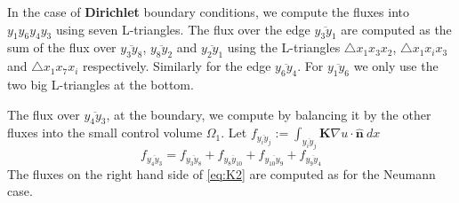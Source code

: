 \documentclass[../Main/main.tex]{subfiles}
\begin{document}
	\par
	In the case of \textbf{Dirichlet} boundary conditions, we compute the fluxes into $y_1 y_6 y_4 y_3$ using seven L-triangles. The flux over the edge $\overline{y_3 y_1}$ are computed as the sum of the flux over $\overline{y_3 y_8}$, $\overline{y_8 y_2}$ and $\overline{y_2 y_1}$ using the L-triangles $\triangle x_1 x_3 x_2$, $\triangle x_1 x_i x_3$ and $\triangle x_1 x_7 x_i$ respectively. Similarly for the edge $\overline{y_6 y_4}$. For $\overline{y_1 y_6}$ we only use the two big L-triangles at the bottom. 
	\par 
	The flux over $\overline{y_4 y_3}$, at the boundary, we compute by balancing it by the other fluxes into the small control volume $\Omega_1$. Let $	f_{\overline{y_i y_j}}:= \int_{\overline{y_i y_j}}  \pmb{K}\nabla u \cdot \pmb{\hat{n}}\ dx $
	\begin{equation}\label{eq:K2}
		f_{\overline{y_4 y_3}} = f_{\overline{y_3 y_8}} + f_{\overline{y_8 y_{10}}}+f_{\overline{y_{10}y_9}}+f_{\overline{y_9 y_4}}
	\end{equation}
	The fluxes on the right hand side of \eqref{eq:K2} are computed as for the Neumann case.
\end{document}
